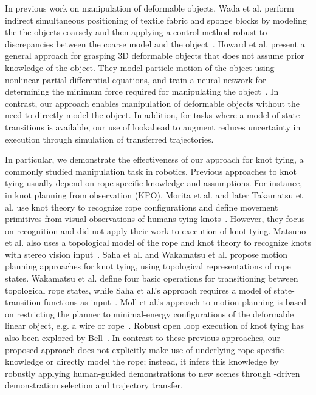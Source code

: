 In previous work on manipulation of deformable objects,
Wada et al. perform indirect simultaneous positioning of
textile fabric and sponge blocks by modeling the
the objects coarsely and then applying a control method robust
to discrepancies between the coarse model and the
object~\cite{Wada_ArticMotion2000}. Howard et al. present a
general approach for grasping 3D deformable objects
that does not assume prior knowledge of the object.
They model particle motion of the object using nonlinear partial differential
equations, and train a neural network for determining the minimum force
required for manipulating the object~\cite{Howard_AutRobots2000}.
In contrast, our approach enables manipulation of deformable objects without
the need to directly model the object. In addition, for tasks
where a model of state-transitions is available, our use of
lookahead to augment \mmql{} reduces uncertainty in execution through
simulation of transferred trajectories.

In particular, we demonstrate the effectiveness of our approach for
knot tying, a commonly studied manipulation task in robotics.
Previous approaches to knot tying usually depend on rope-specific knowledge
and assumptions.
For instance, in knot planning from observation (KPO), Morita et al. and later
Takamatsu et al. use knot theory to recognize rope configurations and define
movement primitives from visual observations of humans tying
knots~\cite{Morita_ICRA2003, Takamatsu_TransRob2006}. However, they focus on
recognition and did not apply their work to execution of knot tying. Matsuno et al.
also uses a topological model of the rope and knot theory to recognize knots with
stereo vision input~\cite{Matsuno_RSJ2006}.
Saha et al. and Wakamatsu et al. propose motion planning approaches for knot tying,
using topological representations of rope states. Wakamatsu et al. define four basic operations for
transitioning between topological rope states,
while Saha et al.'s approach requires a model of state-transition functions
as input~\cite{Saha_ExpRobotics2008, Wakamatsu_IJRR2006}. Moll et al.'s approach
to motion planning is based on restricting the planner to minimal-energy
configurations of the deformable linear object, e.g. a wire or rope~\cite{Moll_IEEERobot2006}.
Robust open loop execution of knot tying has also been explored by Bell~\cite{Bell_PhD2010}.
In contrast to these previous approaches, our proposed approach does not
explicitly make use of underlying rope-specific
knowledge or directly model the rope; instead, it infers this knowledge by
robustly applying human-guided demonstrations to new scenes through
\mmql{}-driven demonstration selection and trajectory transfer.



